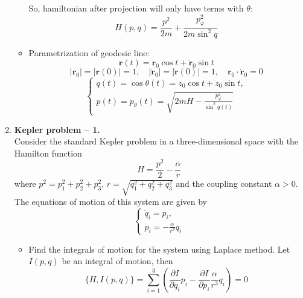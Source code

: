 \documentclass[12pt]{article}
\theoremstyle{definition}
\begin{document}
\begin{enumerate}
\begin{itemize}
        So, hamiltonian after projection will only have terms with $\theta$:
        \begin{equation}
            \boxed{H(p,q)=\frac{p^2}{2m}+\frac{p^2_\varphi}{2m\sin^2 q}}
        \end{equation}
        \item Parametrization of geodesic line:
        \begin{equation}
            \bm{r}(t)=\bm{r}_0\cos t+\dot{\bm{r}}_0\sin t
        \end{equation}
        \begin{equation}
            |\bm{r}_0|=|\bm{r}(0)|=1,\quad |\dot{\bm{r}}_0|=|\dot{\bm{r}}(0)|=1,\quad\bm{r}_0\cdot\dot{\bm{r}}_0=0
        \end{equation}
        \begin{equation}
            \boxed{\begin{cases}
                q(t)=\cos\theta(t)=z_0\cos t+\dot{z}_0\sin t,\\
                p(t)=p_\theta(t)=\sqrt{2mH-\frac{p_\varphi^2}{\sin^2q(t)}}
            \end{cases}}
        \end{equation}
    \end{itemize}
    \item \textbf{Kepler problem -- 1.}\\
    Consider the standard Kepler problem in a three-dimensional space with the Hamilton function
    \begin{equation}
        H=\frac{p^2}{2}-\frac{\alpha}{r}
    \end{equation}
    where $p^2 = p_1^2 + p_2^2 + p_3^2$, $r = \sqrt{q_1^2+q_2^2+q_3^2}$ and the coupling constant $\alpha>0$. The equations of motion of this system are given by
    \begin{equation}
        \begin{cases}
            \dot{q}_i=p_i,\\
            \dot{p}_i=-\frac{\alpha}{r^3}q_i
        \end{cases}
    \end{equation}
    \begin{itemize}
        \item Find the integrals of motion for the system using Laplace method. Let $I(p,q)$ be an integral of motion, then
        \begin{equation}
            \{H,I(p,q)\}=\sum\limits_{i=1}^3\left(\frac{\partial I}{\partial q_i}p_i-\frac{\partial I}{\partial p_i}\frac{\alpha}{r^3}q_i\right)=0

\end{equation}
\end{itemize}
\end{enumerate}
\end{document}
